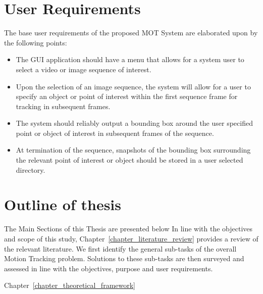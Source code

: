 \section{User Requirements}\label{introduction_user_requirements}
The base user requirements of the proposed MOT System are elaborated upon by the
following points:
\begin{itemize}
    \item The GUI application should have a menu that allows for a system
        user to select a video or image sequence of interest.
    \item Upon the selection of an image sequence, the system will allow for a
        user to specify an object or point of interest within the first sequence
        frame for tracking in subsequent frames.
    \item The system should reliably output a bounding box around the user
        specified point or object of interest in subsequent frames of the
        sequence. 
    \item At termination of the sequence, snapshots of the bounding box
        surrounding the relevant point of interest or object should be stored in
        a user selected directory.
\end{itemize}

\section{Outline of thesis}
The Main Sections of this Thesis are presented below  In line with the objectives and scope
of this study, Chapter~\ref{chapter_literature_review} provides a review of the
relevant literature. We first identify the general sub-tasks of the overall
Motion Tracking problem. Solutions to these sub-tasks are then surveyed and
assessed in line with the objectives, purpose and user requirements. 

Chapter~\ref{chapter_theoretical_framework}  



